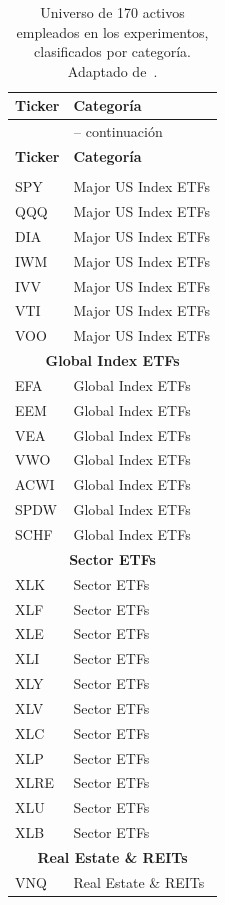 \begin{longtable}{ll}
\caption{Universo de 170 activos empleados en los experimentos, clasificados por categoría. Adaptado de~\cite{arian2025qhrp}.}
\label{TAB:ACTIVOS_UNIVERSO} \\
\hline
\textbf{Ticker} & \textbf{Categoría} \\
\hline
\endfirsthead
\multicolumn{2}{c}{\tablename\ \thetable{} -- continuación} \\
\hline
\textbf{Ticker} & \textbf{Categoría} \\
\hline
\endhead
\hline
\endfoot
\multicolumn{2}{c}{\textbf{Major US Index ETFs}} \\
SPY & Major US Index ETFs \\
QQQ & Major US Index ETFs \\
DIA & Major US Index ETFs \\
IWM & Major US Index ETFs \\
IVV & Major US Index ETFs \\
VTI & Major US Index ETFs \\
VOO & Major US Index ETFs \\
\multicolumn{2}{c}{\textbf{Global Index ETFs}} \\
EFA & Global Index ETFs \\
EEM & Global Index ETFs \\
VEA & Global Index ETFs \\
VWO & Global Index ETFs \\
ACWI & Global Index ETFs \\
SPDW & Global Index ETFs \\
SCHF & Global Index ETFs \\
\multicolumn{2}{c}{\textbf{Sector ETFs}} \\
XLK & Sector ETFs \\
XLF & Sector ETFs \\
XLE & Sector ETFs \\
XLI & Sector ETFs \\
XLY & Sector ETFs \\
XLV & Sector ETFs \\
XLC & Sector ETFs \\
XLP & Sector ETFs \\
XLRE & Sector ETFs \\
XLU & Sector ETFs \\
XLB & Sector ETFs \\
\multicolumn{2}{c}{\textbf{Real Estate \& REITs}} \\
VNQ & Real Estate \& REITs \\

\end{longtable}
